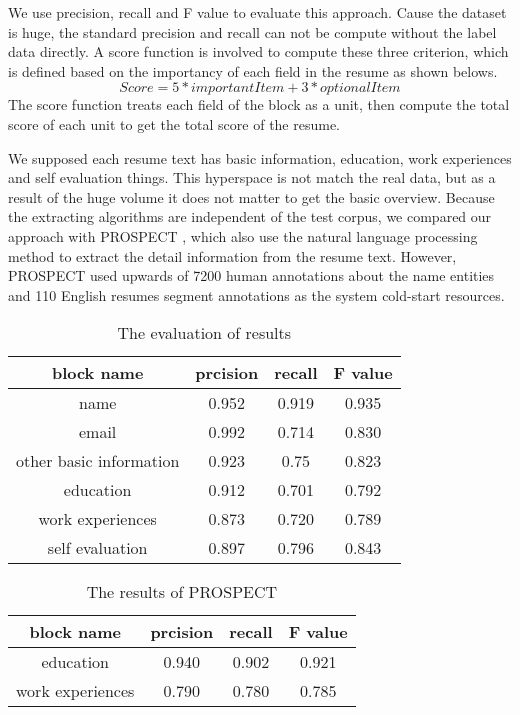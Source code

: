 \documentclass{acm_proc_article-sp}
\begin{document}
We use precision, recall and F value to evaluate this approach.
Cause the dataset is huge, the standard precision and recall can not be compute without the label data directly.
A score function is involved to compute these three criterion, which is defined based on the importancy of each field in the resume as shown belows.
$$Score = 5 * importantItem + 3 * optionalItem$$
The score function treats each field of the block as a unit, then compute the total score of each unit to get the total score of the resume.

We supposed each resume text has basic information, education, work experiences and self evaluation things.
This hyperspace is not match the real data, but as a result of the huge volume it does not matter to get the basic overview.
Because the extracting algorithms are independent of the test corpus, we compared our approach with PROSPECT \cite{Singh:2010:PSS:1871437.1871523}, which also use the natural language processing method to extract the detail information from the resume text.
However, PROSPECT used upwards of 7200 human annotations about the name entities and 110 English resumes segment annotations as the system cold-start resources.

\begin{table}\label{p-r-f}
\centering
\caption{The evaluation of results}
\begin{tabular}{|c|c|c|c|} \hline
block name & prcision & recall & F value\\ \hline
name & 0.952 & 0.919 & 0.935 \\ \hline
email & 0.992 & 0.714 &0.830 \\  \hline
other basic information & 0.923 & 0.75 & 0.823 \\ \hline
education & 0.912 & 0.701 & 0.792\\ \hline
work experiences & 0.873  & 0.720 & 0.789 \\ \hline
self evaluation & 0.897  &0.796 &0.843 \\
\hline\end{tabular}
\end{table}

\begin{table}\label{prospect}
\centering
\caption{The results of PROSPECT}
\begin{tabular}{|c|c|c|c|} \hline
block name  & prcision & recall & F value\\ \hline
education & 0.940 & 0.902 & 0.921 \\ \hline
work experiences & 0.790 & 0.780 & 0.785 \\ \hline
\end{tabular}
\end{table}
\end{document}
